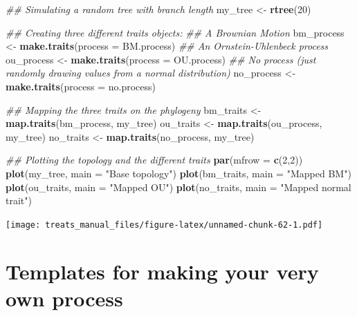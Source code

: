 \documentclass[
]{book}
\newenvironment{Shaded}{\begin{snugshade}}{\end{snugshade}}
\newcommand{\CommentTok}[1]{\textcolor[rgb]{0.56,0.35,0.01}{\textit{#1}}}
\newcommand{\DataTypeTok}[1]{\textcolor[rgb]{0.13,0.29,0.53}{#1}}
\newcommand{\DecValTok}[1]{\textcolor[rgb]{0.00,0.00,0.81}{#1}}
\newcommand{\KeywordTok}[1]{\textcolor[rgb]{0.13,0.29,0.53}{\textbf{#1}}}
\newcommand{\NormalTok}[1]{#1}
\newcommand{\StringTok}[1]{\textcolor[rgb]{0.31,0.60,0.02}{#1}}
\begin{document}
\begin{Shaded}
\begin{Highlighting}[]
\CommentTok{\#\# Simulating a random tree with branch length}
\NormalTok{my\_tree \textless{}{-}}\StringTok{ }\KeywordTok{rtree}\NormalTok{(}\DecValTok{20}\NormalTok{)}

\CommentTok{\#\# Creating three different traits objects:}
\CommentTok{\#\# A Brownian Motion}
\NormalTok{bm\_process \textless{}{-}}\StringTok{ }\KeywordTok{make.traits}\NormalTok{(}\DataTypeTok{process =}\NormalTok{ BM.process)}
\CommentTok{\#\# An Ornstein{-}Uhlenbeck process}
\NormalTok{ou\_process \textless{}{-}}\StringTok{ }\KeywordTok{make.traits}\NormalTok{(}\DataTypeTok{process =}\NormalTok{ OU.process)}
\CommentTok{\#\# No process (just randomly drawing values from a normal distribution)}
\NormalTok{no\_process \textless{}{-}}\StringTok{ }\KeywordTok{make.traits}\NormalTok{(}\DataTypeTok{process =}\NormalTok{ no.process)}

\CommentTok{\#\# Mapping the three traits on the phylogeny}
\NormalTok{bm\_traits \textless{}{-}}\StringTok{ }\KeywordTok{map.traits}\NormalTok{(bm\_process, my\_tree)}
\NormalTok{ou\_traits \textless{}{-}}\StringTok{ }\KeywordTok{map.traits}\NormalTok{(ou\_process, my\_tree)}
\NormalTok{no\_traits \textless{}{-}}\StringTok{ }\KeywordTok{map.traits}\NormalTok{(no\_process, my\_tree)}

\CommentTok{\#\# Plotting the topology and the different traits}
\KeywordTok{par}\NormalTok{(}\DataTypeTok{mfrow =} \KeywordTok{c}\NormalTok{(}\DecValTok{2}\NormalTok{,}\DecValTok{2}\NormalTok{))}
\KeywordTok{plot}\NormalTok{(my\_tree, }\DataTypeTok{main =} \StringTok{"Base topology"}\NormalTok{)}
\KeywordTok{plot}\NormalTok{(bm\_traits, }\DataTypeTok{main =} \StringTok{"Mapped BM"}\NormalTok{)}
\KeywordTok{plot}\NormalTok{(ou\_traits, }\DataTypeTok{main =} \StringTok{"Mapped OU"}\NormalTok{)}
\KeywordTok{plot}\NormalTok{(no\_traits, }\DataTypeTok{main =} \StringTok{"Mapped normal trait"}\NormalTok{)}
\end{Highlighting}
\end{Shaded}

\texttt{[image: treats\_manual\_files/figure-latex/unnamed-chunk-62-1.pdf]}

\hypertarget{templates-for-making-your-very-own-process}{%
\section{Templates for making your very own process}\label{templates-for-making-your-very-own-process}}
\end{document}
